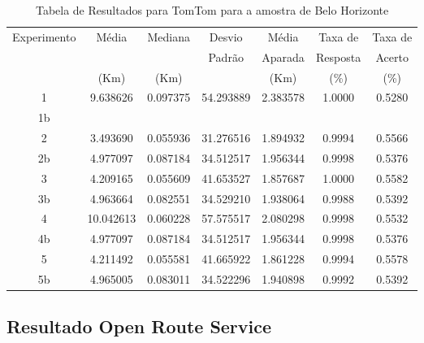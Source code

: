 \begin{anexosenv}
\begin{table}[ht]
\centering
\begin{tabular}{|c|c|c|c|c|c|c|}
\hline
Experimento & Média & Mediana & Desvio & Média & Taxa de & Taxa de \\
 & & & Padrão & Aparada & Resposta & Acerto \\
 & (Km) & (Km) & & (Km) & (\%) & (\%) \\ \hline
1 & 9.638626 & 0.097375 & 54.293889 & 2.383578 & 1.0000 & 0.5280 \\ \hline
1b &  &  &  &  &  &  \\ \hline
2 & 3.493690 & 0.055936 & 31.276516 & 1.894932 & 0.9994 & 0.5566 \\ \hline
2b & 4.977097 & 0.087184 & 34.512517 & 1.956344 & 0.9998 & 0.5376 \\ \hline
3 & 4.209165 & 0.055609 & 41.653527 & 1.857687 & 1.0000 & 0.5582 \\ \hline
3b & 4.963664 & 0.082551 & 34.529210 & 1.938064 & 0.9988 & 0.5392 \\ \hline
4 & 10.042613 & 0.060228 & 57.575517 & 2.080298 & 0.9998 & 0.5532 \\ \hline
4b & 4.977097 & 0.087184 & 34.512517 & 1.956344 & 0.9998 & 0.5376 \\ \hline
5 & 4.211492 & 0.055581 & 41.665922 & 1.861228 & 0.9994 & 0.5578 \\ \hline
5b & 4.965005 & 0.083011 & 34.522296 & 1.940898 & 0.9992 & 0.5392 \\ \hline
\end{tabular}
\caption{Tabela de Resultados para TomTom para a amostra de Belo Horizonte}
\label{tab:tomtomBH}
\end{table}

\subsection{Resultado Open Route  Service}


\end{anexosenv}
